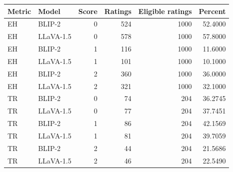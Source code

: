 \begin{tabular}{llrrrr}
\toprule
Metric & Model & Score & Ratings & Eligible ratings & Percent \\
\midrule
EH & BLIP-2 & 0 & 524 & 1000 & 52.4000 \\
EH & LLaVA-1.5 & 0 & 578 & 1000 & 57.8000 \\
EH & BLIP-2 & 1 & 116 & 1000 & 11.6000 \\
EH & LLaVA-1.5 & 1 & 101 & 1000 & 10.1000 \\
EH & BLIP-2 & 2 & 360 & 1000 & 36.0000 \\
EH & LLaVA-1.5 & 2 & 321 & 1000 & 32.1000 \\
TR & BLIP-2 & 0 & 74 & 204 & 36.2745 \\
TR & LLaVA-1.5 & 0 & 77 & 204 & 37.7451 \\
TR & BLIP-2 & 1 & 86 & 204 & 42.1569 \\
TR & LLaVA-1.5 & 1 & 81 & 204 & 39.7059 \\
TR & BLIP-2 & 2 & 44 & 204 & 21.5686 \\
TR & LLaVA-1.5 & 2 & 46 & 204 & 22.5490 \\
\bottomrule
\end{tabular}

